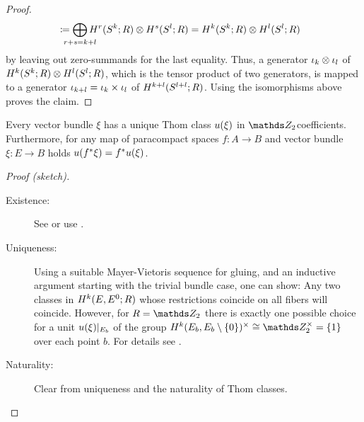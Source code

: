 \begin{Cor}
\begin{proof}
\begin{align*}
      &\coloneqq
        \bigoplus_{\mathclap{r+s=\rkk+\rkl}}
        \H^r(\Sphere{\rkk};R)\otimes \H^s(\Sphere{\rkl};R)
        =
        \H^{\rkk}(\Sphere{\rkk};R)\otimes \H^{\rkl}(\Sphere{\rkl};R)
    \end{align*}
    by leaving out zero-summands for the last equality.
    Thus, a generator $\iota_{k}\otimes\iota_{l}$ of
    $H^{k}(S^{k}; R)\otimes H^{l}(S^{l}; R)$,
    which is the tensor product of two generators,
    is mapped to a generator $\iota_{k+l}=\iota_{k}\times\iota_{l}$ of
    $H^{k+l}(S^{l+l}; R)$.
    Using the isomorphisms above proves the claim.
  \end{proof}
\end{Cor}

\begin{Cor}
  Every vector bundle $\xi$ has a unique Thom class ${u}(\xi)$ in
  $\Zmod2$\nbd{}coefficients.
  Furthermore, for any map of paracompact spaces $f\colon A\to B$ and
  vector bundle $\xi\colon E\to B$ holds ${u}({f}^* \xi) = {f}^* {u}(\xi)$.
  \begin{proof}[Proof (sketch)]
    \begin{description}
    \item[Existence:] See \cite[Theorem~4D.10]{hatcher} or use
      \cite[Prop.~17.9.3]{tomdieck}.
    \item[Uniqueness:]
      Using a suitable Mayer-Vietoris sequence for gluing, and an
      inductive argument starting with the trivial bundle case, one can show:
      Any two classes in $H^{k}(E, {E}^0;R)$ whose
      restrictions coincide on all fibers will coincide.
      However, for $R=\Zmod2$ there is exactly one possible choice for
      a unit ${u}(\xi)|_{E_b}$ of the group
      $\H^{\rkk}(\spherepair{E_b})^\times\cong\Zmod2^\times=\{1\}$
      over each point $b$.
      For details see \forexample \cite[Theorem~(17.9.4)]{tomdieck}.
    \item[Naturality:]
      Clear from uniqueness and the naturality of Thom classes.
    \end{description}
  \end{proof}
\end{Cor}

